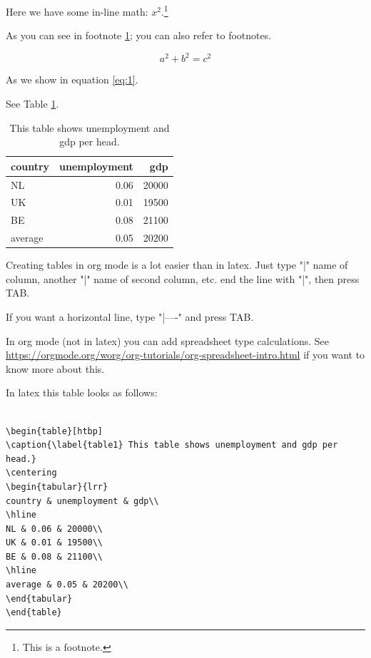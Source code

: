 \documentclass[11pt]{article}
\begin{document}
Here we have some in-line math: \(x^2\).\footnote{\label{fn:footnote} This is a footnote.}

As you can see in footnote \ref{fn:footnote}; you can also refer to footnotes.


\begin{equation}
\label{eq:1}
a^2 + b^2 = c^2
\end{equation}

As we show in equation \eqref{eq:1}.

See Table \ref{table1}.

\begin{table}[htbp]
\caption{\label{tab:orgbfc4b80}\label{table1} This table shows unemployment and gdp per head.}
\centering
\begin{tabular}{lrr}
country & unemployment & gdp\\
\hline
NL & 0.06 & 20000\\
UK & 0.01 & 19500\\
BE & 0.08 & 21100\\
\hline
average & 0.05 & 20200\\
\end{tabular}
\end{table}

Creating tables in org mode is a lot easier than in latex. Just type "|" name of column, another "|" name of second column, etc. end the line with "|", then press TAB.

If you want a horizontal line, type "|----" and press TAB.

In org mode (not in latex) you can add spreadsheet type calculations. See \url{https://orgmode.org/worg/org-tutorials/org-spreadsheet-intro.html} if you want to know more about this.

In latex this table looks as follows:

\begin{verbatim}

\begin{table}[htbp]
\caption{\label{table1} This table shows unemployment and gdp per head.}
\centering
\begin{tabular}{lrr}
country & unemployment & gdp\\
\hline
NL & 0.06 & 20000\\
UK & 0.01 & 19500\\
BE & 0.08 & 21100\\
\hline
average & 0.05 & 20200\\
\end{tabular}
\end{table}

\end{verbatim}
\end{document}
